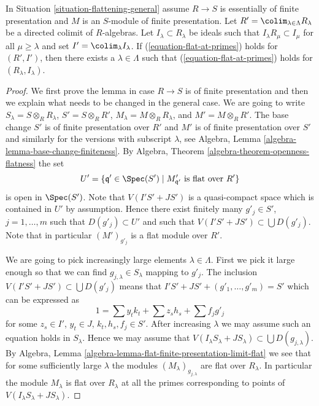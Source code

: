 \begin{lemma}
\label{lemma-limit-preserving-flat-at-primes}
In Situation \ref{situation-flattening-general}
assume $R \to S$ is essentially of finite presentation
and $M$ is an $S$-module of finite presentation. Let
$R' = \colim_{\lambda \in \Lambda} R_\lambda$
be a directed colimit of $R$-algebras. Let $I_\lambda \subset R_\lambda$
be ideals such that $I_\lambda R_\mu \subset I_\mu$ for all
$\mu \geq \lambda$ and set $I' = \colim_\lambda I_\lambda$.
If (\ref{equation-flat-at-primes}) holds for
$(R', I')$, then there exists a $\lambda \in \Lambda$ such that
(\ref{equation-flat-at-primes}) holds for $(R_\lambda, I_\lambda)$.
\end{lemma}

\begin{proof}
We first prove the lemma in case $R \to S$ is of finite presentation
and then we explain what needs to be changed in the general case.
We are going to write $S_\lambda = S \otimes_R R_\lambda$,
$S' = S \otimes_R R'$, $M_\lambda = M \otimes_R R_\lambda$, and
$M' = M \otimes_R R'$.
The base change $S'$ is of finite presentation over $R'$ and
$M'$ is of finite presentation over $S'$ and similarly for the
versions with subscript $\lambda$, see
Algebra, Lemma \ref{algebra-lemma-base-change-finiteness}.
By
Algebra, Theorem \ref{algebra-theorem-openness-flatness}
the set
$$
U' = \{\mathfrak q' \in \Spec(S') \mid
M'_{\mathfrak q'}\text{ is flat over }R'\}
$$
is open in $\Spec(S')$. Note that $V(I'S' + JS')$
is a quasi-compact space which is contained in $U'$ by assumption.
Hence there exist finitely many $g'_j \in S'$, $j = 1, \ldots, m$
such that $D(g'_j) \subset U'$ and such
that $V(I'S' + JS') \subset \bigcup D(g'_j)$.
Note that in particular $(M')_{g'_j}$ is a flat module over $R'$.

\medskip\noindent
We are going to pick increasingly large elements $\lambda \in \Lambda$.
First we pick it large enough so that we can find
$g_{j, \lambda} \in S_{\lambda}$ mapping to $g'_j$.
The inclusion $V(I'S' + JS') \subset \bigcup D(g'_j)$ means that
$I'S' + JS' + (g'_1, \ldots, g'_m) = S'$ which can be expressed as
$$
1 = \sum y_tk_t + \sum z_sh_s + \sum f_jg'_j
$$
for some $z_s \in I'$, $y_t \in J$, $k_t, h_s, f_j \in S'$.
After increasing $\lambda$ we may assume such an equation holds in
$S_\lambda$. Hence we may assume that
$V(I_\lambda S_\lambda + J S_\lambda) \subset \bigcup D(g_{j, \lambda})$. By
Algebra, Lemma \ref{algebra-lemma-flat-finite-presentation-limit-flat}
we see that for some sufficiently large $\lambda$ the modules
$(M_\lambda)_{g_{j, \lambda}}$ are flat over $R_\lambda$.
In particular the module $M_\lambda$ is flat over $R_\lambda$
at all the primes corresponding to points of
$V(I_\lambda S_\lambda + J S_\lambda)$.


\end{proof}
